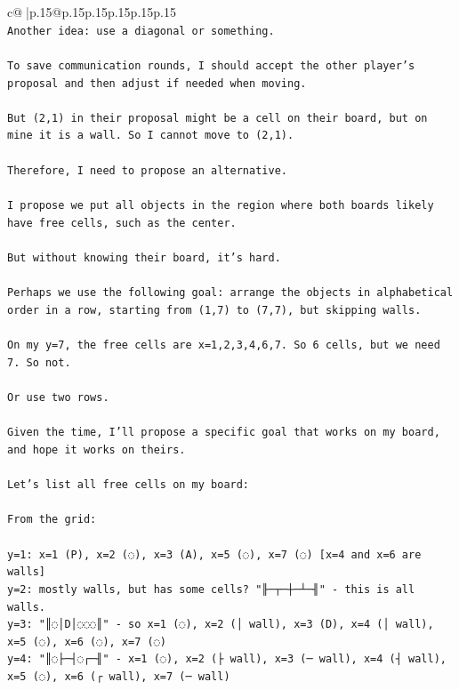 \documentclass{article}
\begin{document}
{\begin{supertabular}{c@{$\;$}|p{.15\linewidth}@{}p{.15\linewidth}p{.15\linewidth}p{.15\linewidth}p{.15\linewidth}p{.15\linewidth}}
{{{\\ 
\texttt{Another idea: use a diagonal or something.} \\
\\ 
\texttt{To save communication rounds, I should accept the other player's proposal and then adjust if needed when moving.} \\
\\ 
\texttt{But (2,1) in their proposal might be a cell on their board, but on mine it is a wall. So I cannot move to (2,1).} \\
\\ 
\texttt{Therefore, I need to propose an alternative.} \\
\\ 
\texttt{I propose we put all objects in the region where both boards likely have free cells, such as the center.} \\
\\ 
\texttt{But without knowing their board, it's hard.} \\
\\ 
\texttt{Perhaps we use the following goal: arrange the objects in alphabetical order in a row, starting from (1,7) to (7,7), but skipping walls.} \\
\\ 
\texttt{On my y=7, the free cells are x=1,2,3,4,6,7. So 6 cells, but we need 7. So not.} \\
\\ 
\texttt{Or use two rows.} \\
\\ 
\texttt{Given the time, I'll propose a specific goal that works on my board, and hope it works on theirs.} \\
\\ 
\texttt{Let's list all free cells on my board:} \\
\\ 
\texttt{From the grid:} \\
\\ 
\texttt{y=1: x=1 (P), x=2 (◌), x=3 (A), x=5 (◌), x=7 (◌)  {[}x=4 and x=6 are walls{]}} \\
\texttt{y=2: mostly walls, but has some cells? "╟─┬─┼─┴─╢" {-} this is all walls.} \\
\texttt{y=3: "║◌│D│◌◌◌║" {-} so x=1 (◌), x=2 (│ wall), x=3 (D), x=4 (│ wall), x=5 (◌), x=6 (◌), x=7 (◌)} \\
\texttt{y=4: "║◌├─┤◌┌─╢" {-} x=1 (◌), x=2 (├ wall), x=3 (─ wall), x=4 (┤ wall), x=5 (◌), x=6 (┌ wall), x=7 (─ wall)} \\
}}}
\end{supertabular}}
\end{document}
